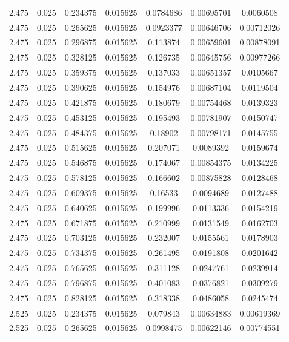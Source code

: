 \begin{table}[bh]
\begin{center}
{\begin{tabular}{ccccccc}
2.475	 & 0.025 & 	0.234375	 & 0.015625	 & 0.0784686	 & 0.00695701	 & 0.0060508 \\ 
2.475	 & 0.025 & 	0.265625	 & 0.015625	 & 0.0923377	 & 0.00646706	 & 0.00712026 \\ 
2.475	 & 0.025 & 	0.296875	 & 0.015625	 & 0.113874	 & 0.00659601	 & 0.00878091 \\ 
2.475	 & 0.025 & 	0.328125	 & 0.015625	 & 0.126735	 & 0.00645756	 & 0.00977266 \\ 
2.475	 & 0.025 & 	0.359375	 & 0.015625	 & 0.137033	 & 0.00651357	 & 0.0105667 \\ 
2.475	 & 0.025 & 	0.390625	 & 0.015625	 & 0.154976	 & 0.00687104	 & 0.0119504 \\ 
2.475	 & 0.025 & 	0.421875	 & 0.015625	 & 0.180679	 & 0.00754468	 & 0.0139323 \\ 
2.475	 & 0.025 & 	0.453125	 & 0.015625	 & 0.195493	 & 0.00781907	 & 0.0150747 \\ 
2.475	 & 0.025 & 	0.484375	 & 0.015625	 & 0.18902	 & 0.00798171	 & 0.0145755 \\ 
2.475	 & 0.025 & 	0.515625	 & 0.015625	 & 0.207071	 & 0.0089392	 & 0.0159674 \\ 
2.475	 & 0.025 & 	0.546875	 & 0.015625	 & 0.174067	 & 0.00854375	 & 0.0134225 \\ 
2.475	 & 0.025 & 	0.578125	 & 0.015625	 & 0.166602	 & 0.00875828	 & 0.0128468 \\ 
2.475	 & 0.025 & 	0.609375	 & 0.015625	 & 0.16533	 & 0.0094689	 & 0.0127488 \\ 
2.475	 & 0.025 & 	0.640625	 & 0.015625	 & 0.199996	 & 0.0113336	 & 0.0154219 \\ 
2.475	 & 0.025 & 	0.671875	 & 0.015625	 & 0.210999	 & 0.0131549	 & 0.0162703 \\ 
2.475	 & 0.025 & 	0.703125	 & 0.015625	 & 0.232007	 & 0.0155561	 & 0.0178903 \\ 
2.475	 & 0.025 & 	0.734375	 & 0.015625	 & 0.261495	 & 0.0191808	 & 0.0201642 \\ 
2.475	 & 0.025 & 	0.765625	 & 0.015625	 & 0.311128	 & 0.0247761	 & 0.0239914 \\ 
2.475	 & 0.025 & 	0.796875	 & 0.015625	 & 0.401083	 & 0.0376821	 & 0.0309279 \\ 
2.475	 & 0.025 & 	0.828125	 & 0.015625	 & 0.318338	 & 0.0486058	 & 0.0245474 \\ 
2.525	 & 0.025 & 	0.234375	 & 0.015625	 & 0.079843	 & 0.00634883	 & 0.00619369 \\ 
2.525	 & 0.025 & 	0.265625	 & 0.015625	 & 0.0998475	 & 0.00622146	 & 0.00774551 \\ 

\end{tabular}}
\end{center}
\end{table}
